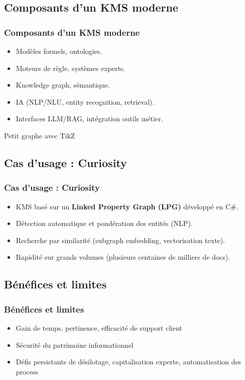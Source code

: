 \documentclass{beamer}
\begin{document}
\subsection{Composants d’un KMS moderne}
\begin{frame}
  \frametitle{Composants d’un KMS moderne}
  \begin{itemize}
    \item Modèles formels, ontologies.
    \item Moteurs de règle, systèmes experts.
    \item Knowledge graph, sémantique.
    \item IA (NLP/NLU, entity recognition, retrieval).
    \item Interfaces LLM/RAG, intégration outils métier.
  \end{itemize}
\end{frame}

\begin{frame}{Petit graphe avec TikZ}
  \begin{center}
  \end{center}
\end{frame}

\subsection{Cas d’usage : Curiosity}
\begin{frame}
  \frametitle{Cas d’usage : Curiosity}
  \begin{itemize}
    \item KMS basé sur un \textbf{Linked Property Graph (LPG)} développé en C\#.
    \item Détection automatique et pondération des entités (NLP).
    \item Recherche par similarité (subgraph embedding, vectorisation texte).
    \item Rapidité sur grands volumes (plusieurs centaines de milliers de docs).
  \end{itemize}
\end{frame}

\subsection{Bénéfices et limites}
\begin{frame}
  \frametitle{Bénéfices et limites}
  \begin{itemize}
    \item Gain de temps, pertinence, efficacité de support client
    \item Sécurité du patrimoine informationnel
    \item Défis persistants de désilotage, capitalisation experte, automatisation des process
  \end{itemize}
\end{frame}
\end{document}
